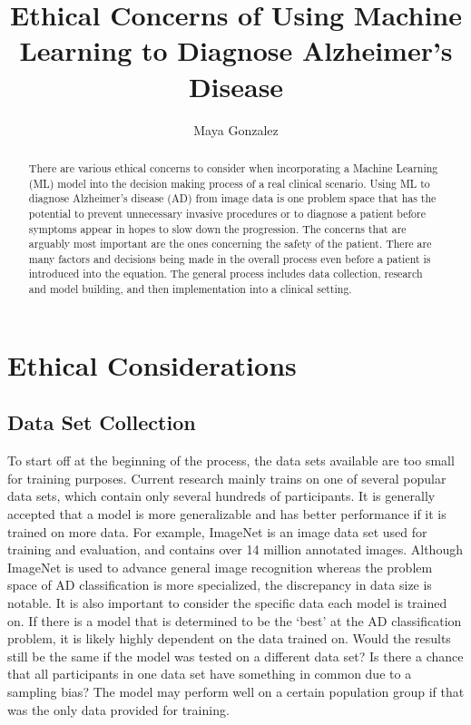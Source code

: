 \documentclass[10pt,twocolumn]{article}
\title{Ethical Concerns of Using Machine Learning to Diagnose Alzheimer's Disease}
\author{Maya Gonzalez}
\affiliation{Occidental College}
\begin{document}
\maketitle

\begin{abstract}
There are various ethical concerns to consider when incorporating a Machine Learning (ML) model into the decision making process of a real clinical scenario. Using ML to diagnose Alzheimer’s disease (AD) from image data is one problem space that has the potential to prevent unnecessary invasive procedures or to diagnose a patient before symptoms appear in hopes to slow down the progression. The concerns that are arguably most important are the ones concerning the safety of the patient. There are many factors and decisions being made in the overall process even before a patient is introduced into the equation. The general process includes data collection, research and model building, and then implementation into a clinical setting. 
\end{abstract}
\section{Ethical Considerations}
\subsection{Data Set Collection}
To start off at the beginning of the process, the data sets available are too small for training purposes. Current research mainly trains on one of several popular data sets, which contain only several hundreds of participants. It is generally accepted that a model is more generalizable and has better performance if it is trained on more data. For example, ImageNet is an image data set used for training and evaluation, and contains over 14 million annotated images. Although ImageNet is used to advance general image recognition whereas the problem space of AD classification is more specialized, the discrepancy in data size is notable. It is also important to consider the specific data each model is trained on. If there is a model that is determined to be the ‘best’ at the AD classification problem, it is likely highly dependent on the data trained on. Would the results still be the same if the model was tested on a different data set? Is there a chance that all participants in one data set have something in common due to a sampling bias? The model may perform well on a certain population group if that was the only data provided for training.
\end{document}
